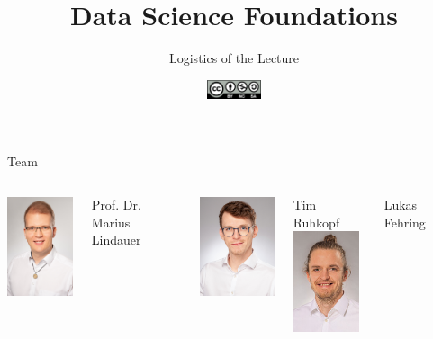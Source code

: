 \documentclass[aspectratio=169,handout]{../latex_main/tntbeamer}  %
\title[Orga]{Data Science Foundations}
\subtitle{Logistics of the Lecture}
\date{\hspace{0.5em} {\includegraphics[height=1.5em]{../latex_main/figures/Cc-by-nc-sa_icon.svg.png}}
}
\begin{document}
	
	\maketitle

\begin{frame}[c]{Team}

\begin{columns}[T]




\centering
\includegraphics[height=8em]{./figures/Lindauer_Marius_004small.jpg}

Prof. Dr.\\ Marius Lindauer


\centering
\includegraphics[height=8em]{./figures/tim}

Tim Ruhkopf\\

\centering
\includegraphics[height=8em]{./figures/lukas}

Lukas Fehring\\

\end{columns}

\end{frame}
\end{document}
